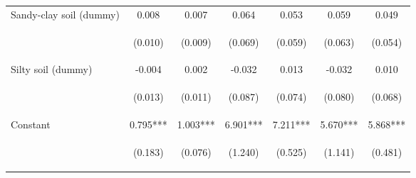 \begin{center}
\begin{tabular}{lcccccc}
Sandy-clay soil (dummy) & 0.008 & 0.007 & 0.064 & 0.053 & 0.059 & 0.049 \\
\vspace{4pt} & \begin{footnotesize}(0.010)\end{footnotesize} & \begin{footnotesize}(0.009)\end{footnotesize} & \begin{footnotesize}(0.069)\end{footnotesize} & \begin{footnotesize}(0.059)\end{footnotesize} & \begin{footnotesize}(0.063)\end{footnotesize} & \begin{footnotesize}(0.054)\end{footnotesize} \\
Silty soil (dummy) & -0.004 & 0.002 & -0.032 & 0.013 & -0.032 & 0.010 \\
\vspace{4pt} & \begin{footnotesize}(0.013)\end{footnotesize} & \begin{footnotesize}(0.011)\end{footnotesize} & \begin{footnotesize}(0.087)\end{footnotesize} & \begin{footnotesize}(0.074)\end{footnotesize} & \begin{footnotesize}(0.080)\end{footnotesize} & \begin{footnotesize}(0.068)\end{footnotesize} \\
Constant & 0.795*** & 1.003*** & 6.901*** & 7.211*** & 5.670*** & 5.868*** \\
 & \begin{footnotesize}(0.183)\end{footnotesize} & \begin{footnotesize}(0.076)\end{footnotesize} & \begin{footnotesize}(1.240)\end{footnotesize} & \begin{footnotesize}(0.525)\end{footnotesize} & \begin{footnotesize}(1.141)\end{footnotesize} & \begin{footnotesize}(0.481)\end{footnotesize} \\

\end{tabular}
\end{center}
